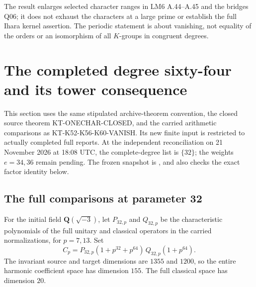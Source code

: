 \documentclass[11pt,a4paper]{article}
\theoremstyle{definition}
\begin{document}
The result enlarges selected character ranges in LM6 A.44--A.45
and the bridges Q06; it does not exhaust the characters at a
large prime or establish the full Ihara kernel assertion.
The periodic statement is about vanishing, not equality of the
orders or an isomorphism of all $K$-groups in congruent degrees.



\section{The completed degree sixty-four and its tower consequence}
\label{sec:kt-next-vanishing}

This section uses the same stipulated archive-theorem convention,
the closed source theorem KT-ONECHAR-CLOSED, and the carried
arithmetic comparisons as KT-K52-K56-K60-VANISH.  Its new finite
input is restricted to actually completed full reports.  At the
independent reconciliation on 21 November 2026 at 18:08 UTC,
the complete-degree list is $\{32\}$; the weights $e=34,36$
remain pending.  The frozen snapshot is
, and
 also checks the exact factor
identity below.

\subsection{The full comparisons at parameter 32}

For the initial field $\mathbf Q(\sqrt{-3})$, let
$P_{32,p}$ and $Q_{32,p}$ be the characteristic polynomials
of the full unitary and classical operators in the carried
normalizations, for $p=7,13$.  Set
\[
 C_p=P_{32,p}(1+p^{32}+p^{64})\,
                         Q_{32,p}(1+p^{64}).                 \tag{KN.1}
\]
The invariant source and target dimensions are $1355$ and
$1200$, so the entire harmonic coefficient space has dimension
$155$.  The full classical space has dimension $20$.
\end{document}
